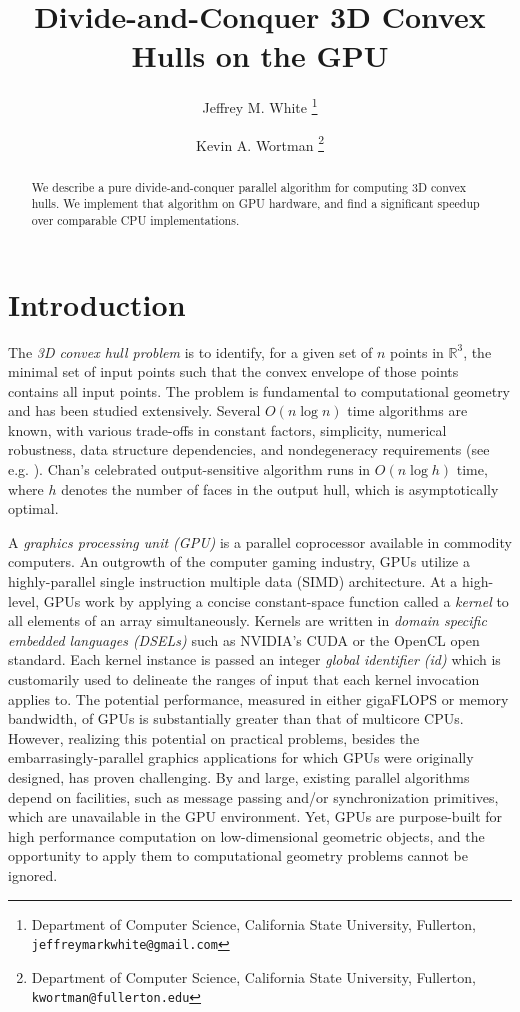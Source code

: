 \documentclass{article}
\title{Divide-and-Conquer 3D Convex Hulls on the GPU}
\author{
Jeffrey M. White \thanks{Department of Computer Science,
California State University, Fullerton, {\tt jeffreymarkwhite@gmail.com}}
\and
Kevin A. Wortman \thanks{Department of Computer Science,
California State University, Fullerton, {\tt kwortman@fullerton.edu}}
}
\begin{document}
\thispagestyle{empty}
\maketitle


\begin{abstract}
We describe a pure divide-and-conquer parallel algorithm for computing 3D convex hulls. We implement that algorithm on GPU hardware, and find a significant speedup over comparable CPU implementations.
\end{abstract}

\section{Introduction}

The \emph{3D convex hull problem} is to identify, for a given set of $n$ points in $\mathbb{R}^3$, the minimal set of input points such that the convex envelope of those points contains all input points. The problem is fundamental to computational geometry and has been studied extensively. Several $O(n \log n)$ time algorithms are known, with various trade-offs in constant factors, simplicity, numerical robustness, data structure dependencies, and nondegeneracy requirements  (see e.g. \cite{Akl1978219} \cite{Barber:1996:QAC:235815.235821} \cite{springerlink:10.1007/BF02573985} \cite{Eddy:1977:NCH:355759.355766}  \cite{kirkpatrick:287} \cite{Preparata:1977:CHF:359423.359430} \cite{seidel81}). Chan's celebrated output-sensitive algorithm \cite{springerlink:10.1007/BF02712873} runs in $O(n \log h)$ time, where $h$ denotes the number of faces in the output hull, which is asymptotically optimal.

A \emph{graphics processing unit (GPU)} is a parallel coprocessor available in commodity computers. An outgrowth of the computer gaming industry, GPUs utilize a highly-parallel single instruction multiple data (SIMD) architecture. At a high-level, GPUs work by applying a concise constant-space function called a \emph{kernel} to all elements of an array simultaneously. Kernels are written in \emph{domain specific embedded languages (DSELs)} such as NVIDIA's CUDA \cite{CUDAGuide2.0} or the OpenCL \cite{Opencl_theopencl} open standard. Each kernel instance is passed an integer \emph{global identifier (id)} which is customarily used to delineate the ranges of input that each kernel invocation applies to. The potential performance, measured in either gigaFLOPS or memory bandwidth, of GPUs is substantially greater than that of multicore CPUs. However, realizing this potential on practical problems, besides the embarrasingly-parallel graphics applications for which GPUs were originally designed, has proven challenging. By and large, existing parallel algorithms depend on facilities, such as message passing and/or synchronization primitives, which are unavailable in the GPU environment. Yet, GPUs are purpose-built for high performance computation on low-dimensional geometric objects, and the opportunity to apply them to computational geometry problems cannot be ignored.
\end{document}
